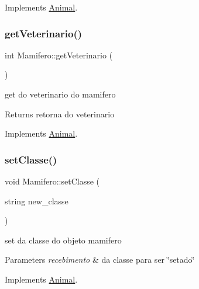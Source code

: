 Implements \mbox{\hyperlink{class_animal}{Animal}}.

\mbox{\label{class_mamifero_a11888abffb8a926994838ef0672564d7}} 
\subsubsection{\texorpdfstring{getVeterinario()}{getVeterinario()}}
{\footnotesize\ttfamily int Mamifero\+::get\+Veterinario (\begin{DoxyParamCaption}{ }\end{DoxyParamCaption})\hspace{0.3cm}{\ttfamily [virtual]}}



get do veterinario do mamifero 

\begin{DoxyReturn}{Returns}
retorna do veterinario 
\end{DoxyReturn}


Implements \mbox{\hyperlink{class_animal}{Animal}}.

\mbox{\label{class_mamifero_adfef03fea98466634d10d1db6556f63f}} 
\subsubsection{\texorpdfstring{setClasse()}{setClasse()}}
{\footnotesize\ttfamily void Mamifero\+::set\+Classe (\begin{DoxyParamCaption}\item[{string}]{new\+\_\+classe }\end{DoxyParamCaption})\hspace{0.3cm}{\ttfamily [virtual]}}



set da classe do objeto mamifero 


\begin{DoxyParams}{Parameters}
{\em recebimento} & da classe para ser \char`\"{}setado\char`\"{} \\
\hline
\end{DoxyParams}


Implements \mbox{\hyperlink{class_animal}{Animal}}.

\mbox{\label{class_mamifero_ab8f0efa8d0932f7549272478f0fc0b6f}} 
